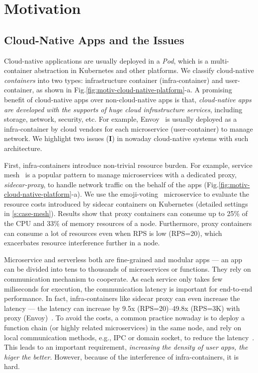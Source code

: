 \section{Motivation}
\label{s:challenge}

\subsection{Cloud-Native Apps and the Issues}

Cloud-native applications are usually deployed in a \emph{Pod}, which is a multi-container abstraction in Kubernetes and other platforms.
We classify cloud-native \emph{containers} into two types: infrastructure container (infra-container) and user-container, as shown in Fig.\ref{fig:motiv-cloud-native-platform}-a.
A promising benefit of cloud-native apps over non-cloud-native apps is that, \emph{cloud-native apps are developed with the supports of huge cloud infrastructure services}, including storage, network, security, etc.
For example, Envoy~\cite{envoy} is usually deployed as a infra-container by cloud vendors for each microservice (user-container) to manage network.
We highlight two issues (\textbf{I}) in nowaday cloud-native systems with such architecture.

First, infra-containers introduce non-trivial resource burden.
For example, service mesh~\cite{service-mesh} is a popular pattern to manage microservices with a dedicated proxy, \emph{sidecar-proxy}, to handle network traffic on the behalf of the apps (Fig.\ref{fig:motiv-cloud-native-platform}-a).
We use the emoji-voting~\cite{emojivote} microservice to evaluate the resource costs introduced by sidecar containers on Kubernetes (detailed settings in \textsection\ref{s:case-mesh}).
Results show that proxy containers can consume up to 25\% of the CPU and 33\% of memory resources of a node.
Furthermore, proxy containers can consume a lot of resources even when RPS is low (RPS=20), which exacerbates resource interference further in a node.

Microservice and serverless both are fine-grained and modular apps --- an app can be divided into tens to thousands of microservices or functions.
They rely on communication mechanism to cooperate.
As each service only takes few miliseconds for execution, the communication latency is important for end-to-end performance.
In fact, infra-containers like sidecar proxy can even increase the latency --- the latency can increase by 9.5x (RPS=20)--49.8x (RPS=3K) with proxy (Envoy)~\cite{10.1145/3620678.3624785}.
To avoid the costs, a common practice nowaday is to deploy a function chain (or highly related microservices) in the same node, and rely on local communication methods, e.g., IPC or domain socket, to reduce the latency~\cite{jianightcore, 10.1145/3503222.3507732, 273833, akkus2018sand}.
This leads to an important requirement, \emph{increasing the density of user apps, the higer the better.}
However, because of the interference of infra-containers, it is hard.

